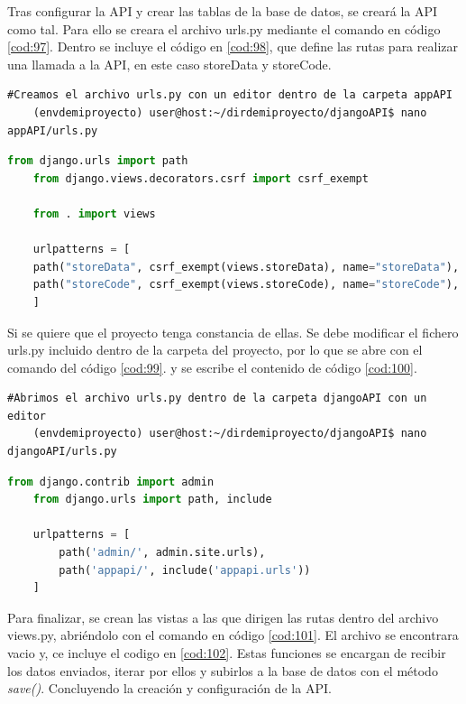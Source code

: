 Tras configurar la API y crear las tablas de la base de datos, se creará la API como tal. Para ello se creara el archivo urls.py mediante el comando en código \ref{cod:97}. Dentro se incluye el código en \ref{cod:98}, que define las rutas para realizar una llamada a la API, en este caso storeData y storeCode.

\begin{lstlisting}[caption={Instrucción por consola para crear y abrir el fichero urls.py dentro de la carpeta de la app en un editor de texto}, label=cod:97]
	#Creamos el archivo urls.py con un editor dentro de la carpeta appAPI
	(envdemiproyecto) user@host:~/dirdemiproyecto/djangoAPI$ nano appAPI/urls.py
\end{lstlisting}

\begin{lstlisting}[language=Python, caption={Definición URLs API}, label=cod:98]
	from django.urls import path
	from django.views.decorators.csrf import csrf_exempt
	
	from . import views
	
	urlpatterns = [
	path("storeData", csrf_exempt(views.storeData), name="storeData"),
	path("storeCode", csrf_exempt(views.storeCode), name="storeCode"),
	]
\end{lstlisting}

Si se quiere que el proyecto tenga constancia de ellas. Se debe modificar el fichero urls.py incluido dentro de la carpeta del proyecto, por lo que se abre con el comando del código \ref{cod:99}. y se escribe el contenido de código \ref{cod:100}.

\begin{lstlisting}[caption={Instrucción por consola para abrir el fichero urls.py dentro de la carpeta del proyecto en un editor de texto}, label=cod:99]
	#Abrimos el archivo urls.py dentro de la carpeta djangoAPI con un editor
	(envdemiproyecto) user@host:~/dirdemiproyecto/djangoAPI$ nano djangoAPI/urls.py
\end{lstlisting}

\begin{lstlisting}[language=Python, caption={Configuración URLs API}, label=cod:100]
	from django.contrib import admin
	from django.urls import path, include
	
	urlpatterns = [
		path('admin/', admin.site.urls),
		path('appapi/', include('appapi.urls'))
	]
\end{lstlisting}

Para finalizar, se crean las vistas a las que dirigen las rutas dentro del archivo views.py, abriéndolo con el comando en código \ref{cod:101}. El archivo se encontrara vacio y, ce incluye el codigo en \ref{cod:102}. Estas funciones se encargan de recibir los datos enviados, iterar por ellos y subirlos a la base de datos con el método \textit{save()}. Concluyendo la creación y configuración de la API.

